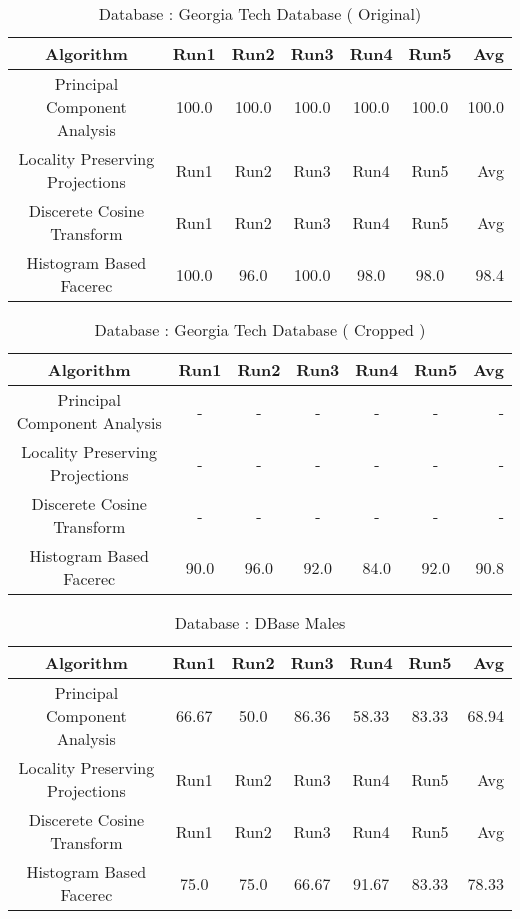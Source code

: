 \documentclass[10pt,a4paper]{article}
\begin{document}
\begin{center}
\begin{table}
\caption{Database : Georgia Tech Database ( Original) }
\centering
\begin{tabular}{| c | c | c | c | c | c | r | } \hline 
Algorithm & Run1 & Run2 & Run3 & Run4 & Run5 & Avg  \\  
\hline
Principal Component Analysis & 100.0 & 100.0 & 100.0 & 100.0 & 100.0 & 100.0 \\
\hline
Locality Preserving Projections & Run1 & Run2 & Run3 & Run4 & Run5 & Avg \\
\hline
Discerete Cosine Transform & Run1 & Run2 & Run3 & Run4 & Run5 & Avg \\
\hline
Histogram Based Facerec & 100.0 & 96.0 & 100.0 & 98.0 & 98.0 & 98.4 \\
\hline
\end{tabular}
\end{table}

\begin{table}
\caption{Database : Georgia Tech Database ( Cropped ) }
\centering
\begin{tabular}{| c | c | c | c | c | c | r | } \hline 
Algorithm & Run1 & Run2 & Run3 & Run4 & Run5 & Avg  \\  
\hline
Principal Component Analysis & - & - & - & - & - & - \\
\hline
Locality Preserving Projections & - & - & - & - & - & - \\
\hline
Discerete Cosine Transform & - & - & - & - & - & - \\
\hline
Histogram Based Facerec & 90.0 & 96.0 & 92.0 & 84.0 & 92.0 & 90.8 \\
\hline
\end{tabular}
\end{table}

\begin{table}
\caption{Database : DBase Males }
\centering
\begin{tabular}{| c | c | c | c | c | c | r | } \hline 
Algorithm & Run1 & Run2 & Run3 & Run4 & Run5 & Avg  \\  
\hline
Principal Component Analysis & 66.67 & 50.0 & 86.36 & 58.33 & 83.33 & 68.94 \\
\hline
Locality Preserving Projections & Run1 & Run2 & Run3 & Run4 & Run5 & Avg \\
\hline
Discerete Cosine Transform & Run1 & Run2 & Run3 & Run4 & Run5 & Avg \\
\hline
Histogram Based Facerec & 75.0 & 75.0 & 66.67 & 91.67 & 83.33 & 78.33 \\
\hline
\end{tabular}
\end{table}



\end{center}
\end{document}
